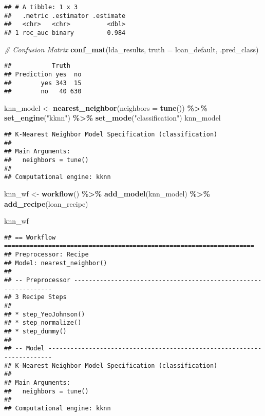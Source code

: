 \documentclass[
]{article}
\newenvironment{Shaded}{\begin{snugshade}}{\end{snugshade}}
\newcommand{\AttributeTok}[1]{\textcolor[rgb]{0.13,0.29,0.53}{#1}}
\newcommand{\CommentTok}[1]{\textcolor[rgb]{0.56,0.35,0.01}{\textit{#1}}}
\newcommand{\FunctionTok}[1]{\textcolor[rgb]{0.13,0.29,0.53}{\textbf{#1}}}
\newcommand{\NormalTok}[1]{#1}
\newcommand{\OtherTok}[1]{\textcolor[rgb]{0.56,0.35,0.01}{#1}}
\newcommand{\SpecialCharTok}[1]{\textcolor[rgb]{0.81,0.36,0.00}{\textbf{#1}}}
\newcommand{\StringTok}[1]{\textcolor[rgb]{0.31,0.60,0.02}{#1}}
\begin{document}
\begin{verbatim}
## # A tibble: 1 x 3
##   .metric .estimator .estimate
##   <chr>   <chr>          <dbl>
## 1 roc_auc binary         0.984
\end{verbatim}

\begin{Shaded}
\begin{Highlighting}[]
\CommentTok{\# Confusion Matrix}
\FunctionTok{conf\_mat}\NormalTok{(lda\_results, }\AttributeTok{truth =}\NormalTok{ loan\_default, .pred\_class)}
\end{Highlighting}
\end{Shaded}

\begin{verbatim}
##           Truth
## Prediction yes  no
##        yes 343  15
##        no   40 630
\end{verbatim}

\begin{Shaded}
\begin{Highlighting}[]
\NormalTok{knn\_model }\OtherTok{\textless{}{-}} \FunctionTok{nearest\_neighbor}\NormalTok{(}\AttributeTok{neighbors =} \FunctionTok{tune}\NormalTok{()) }\SpecialCharTok{\%\textgreater{}\%} 
             \FunctionTok{set\_engine}\NormalTok{(}\StringTok{"kknn"}\NormalTok{) }\SpecialCharTok{\%\textgreater{}\%} 
             \FunctionTok{set\_mode}\NormalTok{(}\StringTok{"classification"}\NormalTok{)}
\NormalTok{knn\_model}
\end{Highlighting}
\end{Shaded}

\begin{verbatim}
## K-Nearest Neighbor Model Specification (classification)
## 
## Main Arguments:
##   neighbors = tune()
## 
## Computational engine: kknn
\end{verbatim}

\begin{Shaded}
\begin{Highlighting}[]
\NormalTok{knn\_wf }\OtherTok{\textless{}{-}} \FunctionTok{workflow}\NormalTok{() }\SpecialCharTok{\%\textgreater{}\%} 
          \FunctionTok{add\_model}\NormalTok{(knn\_model) }\SpecialCharTok{\%\textgreater{}\%} 
          \FunctionTok{add\_recipe}\NormalTok{(loan\_recipe)}

\NormalTok{knn\_wf}
\end{Highlighting}
\end{Shaded}

\begin{verbatim}
## == Workflow ====================================================================
## Preprocessor: Recipe
## Model: nearest_neighbor()
## 
## -- Preprocessor ----------------------------------------------------------------
## 3 Recipe Steps
## 
## * step_YeoJohnson()
## * step_normalize()
## * step_dummy()
## 
## -- Model -----------------------------------------------------------------------
## K-Nearest Neighbor Model Specification (classification)
## 
## Main Arguments:
##   neighbors = tune()
## 
## Computational engine: kknn
\end{verbatim}
\end{document}
